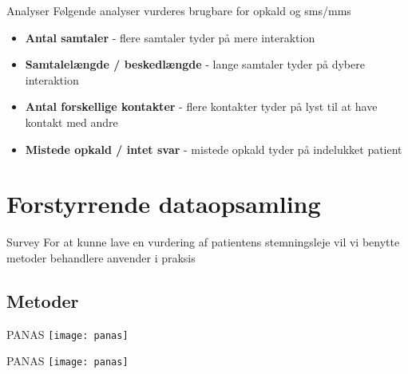 { %
\begin{frame}{Analyser} %
Følgende analyser vurderes brugbare for opkald og sms/mms
\begin{itemize}
	\item \textbf{Antal samtaler} - flere samtaler tyder på mere interaktion
	\item \textbf{Samtalelængde / beskedlængde} - lange samtaler tyder på dybere interaktion
	\item \textbf{Antal forskellige kontakter} - flere kontakter tyder på lyst til at have kontakt med andre
	\item \textbf{Mistede opkald / intet svar} - mistede opkald tyder på indelukket patient
\end{itemize}
	
\end{frame}}

\section{Forstyrrende dataopsamling}

\begin{frame}{Survey} 
	For at kunne lave en vurdering af patientens stemningsleje vil vi benytte metoder behandlere anvender i praksis
\end{frame}
	
\subsection{Metoder}
{ 
\begin{frame}{PANAS} %
\texttt{[image: panas]}
	
\end{frame}}

{ %
	\begin{frame}{PANAS} %
		\texttt{[image: panas]}
		
	\end{frame}}

